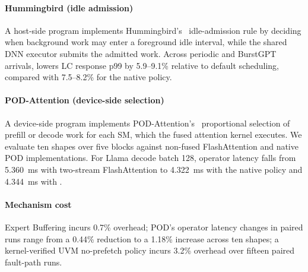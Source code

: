 \paragraph{Hummingbird (idle admission)}
A host-side \sys{} program implements Hummingbird's~\cite{hu2026hummingbird} idle-admission rule by deciding when background work may enter a foreground idle interval, while the shared DNN executor submits the admitted work.
Across periodic and BurstGPT arrivals, \sys{} lowers LC response p99 by 5.9--9.1\% relative to default scheduling, compared with 7.5--8.2\% for the native policy.

\paragraph{POD-Attention (device-side selection)}
A device-side \sys{} program implements POD-Attention's~\cite{kamath2025pod} proportional selection of prefill or decode work for each SM, which the fused attention kernel executes.
We evaluate ten shapes over five blocks against non-fused FlashAttention and native POD implementations.
For Llama decode batch 128, operator latency falls from 5.360~ms with two-stream FlashAttention to 4.322~ms with the native policy and 4.344~ms with \sys{}.

\paragraph{Mechanism cost}
Expert Buffering incurs 0.7\% overhead; POD's operator latency changes in paired runs range from a 0.44\% reduction to a 1.18\% increase across ten shapes; a kernel-verified UVM no-prefetch policy incurs 3.2\% overhead over fifteen paired fault-path runs.

